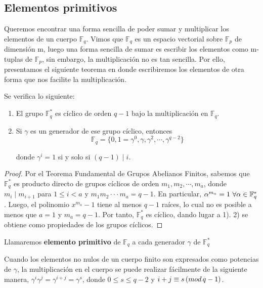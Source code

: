 \subsection{Elementos primitivos}

Queremos encontrar una forma sencilla de poder sumar y multiplicar los elementos de un cuerpo $\mathbb{F}_q$. Vimos que $\mathbb{F}_q$ es un espacio vectorial sobre $\mathbb{F}_p$ de dimensión m, luego una forma sencilla de sumar es escribir los elementos como m-tuplas de $\mathbb{F}_p$, sin embargo, la multiplicación no es tan sencilla. Por ello, presentamos el siguiente teorema en donde escribiremos los elementos de otra forma que nos facilite la multiplicación.

\begin{theorem}
\label{th:elementos_primitivos}
Se verifica lo siguiente:
\begin{enumerate}
	\item El grupo $\mathbb{F}_q^*$ es cíclico de orden $q-1$ bajo la multiplicación en $\mathbb{F}_q$.
	\item Si $\gamma$ es un generador de ese grupo cíclico, entonces
	\[  \mathbb{F}_q = \{ 0, 1 = \gamma^0, \gamma, \gamma^2 , \cdots, \gamma^{q-2} \}\]
	
	donde $\gamma^i = 1$ si y solo si $(q-1) \mid i $.
\end{enumerate}
\end{theorem}

\begin{proof}
Por el Teorema Fundamental de Grupos Abelianos Finitos, sabemos que $\mathbb{F}_q^*$ es producto directo de grupos cíclicos de orden $m_1,m_2, \cdots , m_a$, donde $m_i \mid m_{i+1}$ para $1 \leq i < a$ y $m_1m_2 \cdot \cdot \cdot m_a = q-1$. En particular, $\alpha^{m_a} = 1 \thinspace \thinspace \forall \alpha \in \mathbb{F}_q^*$. Luego, el polinomio $x^{m_a} - 1$ tiene al menos $q-1$ raíces, lo cual no es posible a menos que $a = 1$ y $m_a = q-1$. Por tanto, $\mathbb{F}_q^*$ es cíclico, dando lugar a 1).  2) se obtiene como propiedades de los grupos cíclicos.
\end{proof}
 
\begin{definition}
Llamaremos \textbf{elemento primitivo} de $\mathbb{F}_q$ a cada generador $\gamma$ de $\mathbb{F}_q^*$
\end{definition}

Cuando los elementos no nulos de un cuerpo finito son expresados como potencias de $\gamma$, la multiplicación en el cuerpo se puede realizar fácilmente de la siguiente manera, $\gamma^i\gamma^j = \gamma^{i+j} = \gamma^s$, donde $0 \leq s \leq q-2$ y $i+j \equiv s \thinspace ( mod \thinspace q-1)$.




